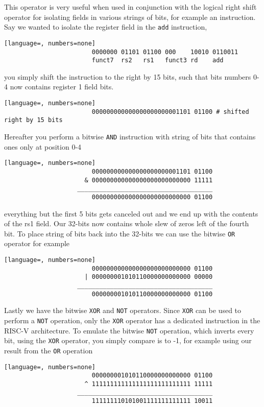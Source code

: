         This operator is very useful when used in conjunction with the logical right shift operator for isolating fields in various strings of bits, for example an instruction. Say we wanted to isolate the register field in the \texttt{add} instruction, 
        \begin{lstlisting}[language=, numbers=none]
                        0000000 01101 01100 000    10010 0110011
                        funct7  rs2   rs1   funct3 rd    add
        \end{lstlisting}
        you simply shift the instruction to the right by 15 bits, such that bits numbers 0-4 now contains register 1 field bits. 
        \begin{lstlisting}[language=, numbers=none]
                        000000000000000000000001101 01100 # shifted right by 15 bits
        \end{lstlisting} 
        Hereafter you perform a bitwise \texttt{AND} instruction with string of bits that contains ones only at position 0-4 
        \begin{lstlisting}[language=, numbers=none]
                        000000000000000000000001101 01100 
                      & 000000000000000000000000000 11111
                    _____________________________________
                        000000000000000000000000000 01100
        \end{lstlisting} 
        everything but the first 5 bits gets canceled out and we end up with the contents of the rs1 field.
        Our 32-bits now contains whole slew of zeros left of the fourth bit. To place string of bits back into the 32-bits we can use the bitwise \texttt{OR} operator for example
        \begin{lstlisting}[language=, numbers=none]
                        000000000000000000000000000 01100
                      | 000000001010110000000000000 00000
                    _____________________________________
                        000000001010110000000000000 01100
        \end{lstlisting}
        Lastly we have the bitwise \texttt{XOR} and \texttt{NOT} operators. Since \texttt{XOR} can be used to perform a \texttt{NOT} operation, only the \texttt{XOR} operator has a dedicated instruction in the RISC-V architecture.
        To emulate the bitwise \texttt{NOT} operation, which inverts every bit, using the \texttt{XOR} operator, you simply compare is to -1, for example using our result from the \texttt{OR} operation
        \begin{lstlisting}[language=, numbers=none]
                        000000001010110000000000000 01100
                      ^ 111111111111111111111111111 11111
                    _____________________________________
                        111111110101001111111111111 10011
        \end{lstlisting}
        
    